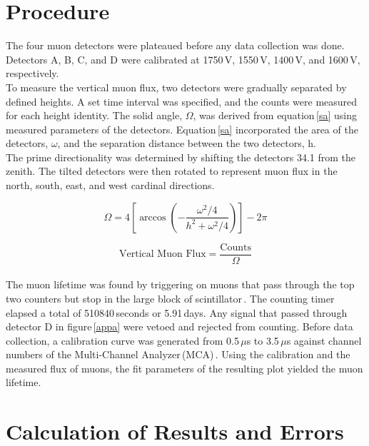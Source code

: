 \documentclass[aps,prl,twocolumn,superscriptaddress,nofootinbib]{revtex4-1}
\begin{document}
\section{Procedure}



The four muon detectors were plateaued before any data collection was done. Detectors A, B, C, and D were calibrated at 1750\,V, 1550\,V, 1400\,V, and 1600\,V, respectively.
\\
\indent To measure the vertical muon flux, two detectors were gradually separated by defined heights. A set time interval was specified, and the counts were measured for each height identity. The solid angle, $\Omega$, was derived from equation\,\ref{sa} using measured parameters of the detectors. Equation\,\ref{sa} incorporated the area of the detectors, $\omega$, and the separation distance between the two detectors, h.
\\
\indent The prime directionality was determined by shifting the detectors {34.1\degree} from the zenith. The tilted detectors were then rotated to represent muon flux in the north, south, east, and west cardinal directions. 

\begin{equation}
\Omega=4\left[\arccos\left(  -\frac{\omega^2/4}{h^2+\omega^2/4}\right)  \right]-2\pi
\label{sa}
\end{equation}

\begin{equation}
\text{Vertical Muon Flux}=\frac{\text{Counts}}{\Omega}
\label{flux}
\end{equation}
\\
\indent The muon lifetime was found by triggering on muons that pass through the top two counters but stop in the large block of scintillator\,\cite{1}. The counting timer elapsed a total of 510840\,seconds or 5.91\,days. Any signal that passed through detector D in figure\,\ref{appa} were vetoed and rejected from counting. Before data collection, a calibration curve was generated from 0.5\,$\mu$s to 3.5\,$\mu$s against channel numbers of the Multi-Channel Analyzer\,(MCA)\,\cite{3}. Using the calibration and the measured flux of muons, the fit parameters of the resulting plot yielded the muon lifetime.




\section{Calculation of Results and Errors}
\end{document}
